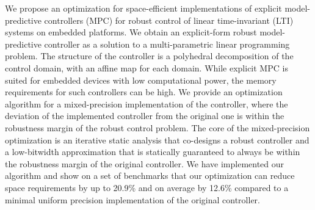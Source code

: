 We propose an optimization for space-efficient implementations of explicit model-predictive controllers (MPC)
for robust control of linear time-invariant (LTI) systems on embedded platforms. 
We obtain an explicit-form robust model-predictive controller as a solution to a multi-parametric 
linear programming problem.
The structure of the controller is a polyhedral decomposition of the control domain,
with an affine map for each domain.
While explicit MPC is suited for embedded devices with low computational power, the memory requirements
for such controllers can be high.
We provide an optimization algorithm for a mixed-precision implementation of the controller,
where the deviation of the implemented controller from the original one is within the robustness
margin of the robust control problem.
The core of the mixed-precision optimization is an iterative static analysis that co-designs
a robust controller and a low-bitwidth approximation 
that is statically guaranteed to always be within the robustness margin of the original controller.
We have implemented our algorithm and show on a set of benchmarks that our optimization
can reduce space requirements by up to 20.9\% and on average by 12.6\% 
compared to a minimal uniform precision implementation of the original controller.

